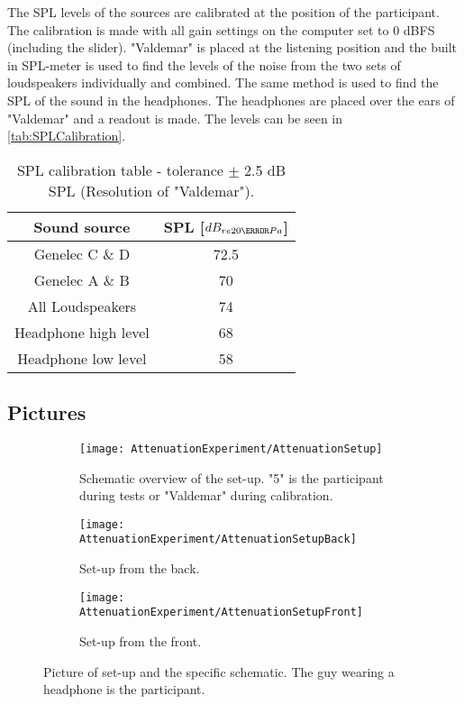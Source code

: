 The SPL levels of the sources are calibrated at the position of the participant. The calibration is made with all gain settings on the computer set to 0 dBFS (including the slider). "Valdemar" is placed at the listening position and the built in SPL-meter is used to find the levels of the noise from the two sets of loudspeakers individually and combined. 
The same method is used to find the SPL of the sound in the headphones. The headphones are placed over the ears of "Valdemar" and a readout is made. The levels can be seen in \autoref{tab:SPLCalibration}.

\begin{table} [H]
\centering
\label{SPLtableNA}
	\begin{tabular}{c c}											\toprule
		Sound source				& 	SPL [$dB_{re20\micro Pa}$]	\\ 	\bottomrule
		Genelec C \& D				& 	72.5					\\
		Genelec A \& B				&	70						\\
		All Loudspeakers				&	74						\\
		Headphone high level		&	68						\\ 	
		Headphone low level			&	58						\\	\bottomrule
	\end{tabular}
	\caption{SPL calibration table - tolerance $\pm$ 2.5 dB SPL (Resolution of "Valdemar").}
	\label{tab:SPLCalibration}
\end{table}   



\subsection{Pictures}

\begin{figure}[H]
\centering
  \begin{subfigure}[b]{0.5\textwidth}
  \centering
%	
	\texttt{[image: AttenuationExperiment/AttenuationSetup]}
	\caption{Schematic overview of the set-up. "5" is the participant during tests or "Valdemar" during calibration.}
	\label{fig:AttenuationSetup}
  \end{subfigure}\qquad
    \begin{subfigure}[b]{0.4\textwidth}
    \texttt{[image: AttenuationExperiment/AttenuationSetupBack]}
    \caption{Set-up from the back.}
    \label{fig:SetupFront}
\vspace{2ex}
    \texttt{[image: AttenuationExperiment/AttenuationSetupFront]}
    \caption{Set-up from the front.}
    \label{fig:SetupBack}
  \end{subfigure}
  \caption{Picture of set-up and the specific schematic. The guy wearing a headphone is the participant.}
\end{figure}


